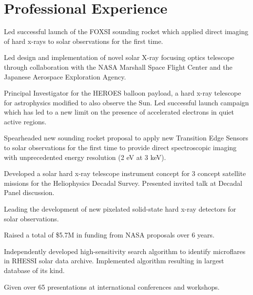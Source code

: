 \documentclass[11pt]{article}
\begin{document}
\section{Professional Experience}
\begin{itemize*}
 \item Led successful launch of the FOXSI sounding rocket which applied direct imaging of hard x-rays to solar observations for the first time.
  \item Led design and implementation of novel solar X-ray focusing optics telescope through collaboration with the NASA Marshall Space Flight Center and the Japanese Aerospace Exploration Agency.
  \item Principal Investigator for the HEROES balloon payload, a hard x-ray telescope for astrophysics modified to also observe the Sun. Led successful launch campaign which has led to a new limit on the presence of accelerated electrons in quiet active regions.
  \item Spearheaded new sounding rocket proposal to apply new Transition Edge Sensors to solar observations for the first time to provide direct spectroscopic imaging with unprecedented energy resolution (2 eV at 3 keV).
  \item Developed a solar hard x-ray telescope instrument concept for 3 concept satellite missions for the Heliophysics Decadal Survey. Presented invited talk at Decadal Panel discussion.
  \item Leading the development of new pixelated solid-state hard x-ray detectors for solar observations.
 \item Raised a total of \$5.7M in funding from NASA proposals over 6 years.
 \item Independently developed high-sensitivity search algorithm to identify microflares in RHESSI solar
data archive. Implemented algorithm resulting in largest database of its kind.
 \item Given over 65 presentations at international conferences and workshops.
\end{itemize*}
\end{document}

